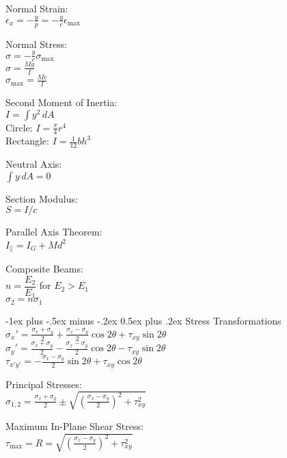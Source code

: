 \documentclass[10pt,landscape]{article}
\makeatletter
\renewcommand{\section}{\@startsection{section}{1}{0mm}%
                                {-1ex plus -.5ex minus -.2ex}%
                                {0.5ex plus .2ex}%
                                {\normalfont\large\bfseries}}
\newcommand{\tab}{\hspace{.02\textwidth}}
\newcommand{\ds}{\displaystyle}
\makeatother
\begin{document}
\begin{multicols}{3}
Normal Strain:\\
\vspace{1mm}
\tab $\ds \epsilon_{x} = -\frac{y}{p} = -\frac{y}{c}\epsilon_{\text{max}}$

Normal Stress:\\
\vspace{1mm}
\tab $\ds \sigma = -\frac{y}{c}\sigma_{\text{max}}$\\
\vspace{1mm}
\tab $\ds \sigma = \frac{My}{I}$\\
\vspace{1mm}
\tab $\ds \sigma_{\text{max}} = \frac{Mc}{I}$

Second Moment of Inertia:\\
\tab $I = \int y^2\,dA$\\
\tab Circle: $\ds I = \frac{\pi}{4}r^4$\\
\tab Rectangle: $\ds I = \frac{1}{12}bh^3$

Neutral Axis:\\
\tab $\int y\,dA = 0$

Section Modulus:\\
\tab $S = I/c$

Parallel Axis Theorem:\\
\tab $I_{\parallel} = I_G + Md^2$

Composite Beams:\\
\tab $n = \dfrac{E_2}{E_1}$ for $E_2 > E_1$\\
\vspace{1mm}
\tab $\sigma_2 = n \sigma_1$

\section{Stress Transformations}
\tab $\ds \sigma_x' = \frac{\sigma_x + \sigma_y}{2}	+ \frac{\sigma_x - \sigma_y}{2}\cos2\theta + \tau_{xy}\sin2\theta$
\\[2mm]
\tab $\ds \sigma_y' = \frac{\sigma_x + \sigma_y}{2}	- \frac{\sigma_x - \sigma_y}{2}\cos2\theta - \tau_{xy}\sin2\theta$
\\[2mm]
\tab $\ds \tau_{x'y'} = -\frac{\sigma_x - \sigma_y}{2}\sin2\theta + \tau_{xy}\cos2\theta$

Principal Stresses:\\
\tab $\ds \sigma_{1,2} = \frac{\sigma_x + \sigma _y}{2} \pm \sqrt{\left(\frac{\sigma_x - \sigma_y}{2}\right)^2 + \tau_{xy}^2}$

Maximum In-Plane Shear Stress:\\
\vspace{1mm}
\tab $\ds \tau_{\text{max}} = R = \sqrt{\left(\frac{\sigma_x - \sigma_y}{2}\right)^2 + \tau_{xy}^2}$


\end{multicols}
\end{document}
